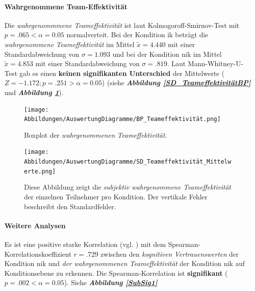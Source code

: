 \documentclass[a4paper,11pt]{article}%
\renewcommand{\\}{\vspace*{0.5\baselineskip} \newline}
\begin{document}
\paragraph{Wahrgenommene Team-Effektivität}
Die \textit{wahrgenommmene Teameffektivität} ist laut Kolmogoroff-Smirnov-Test mit $p = .065 < \alpha = 0.05$ normalverteit. 
Bei der Kondition \ac{ik} beträgt die \textit{wahrgenommene Teameffektivität} im Mittel $\tilde x = 4.440$ mit einer Standardabweichung von $\sigma = 1.093$ und bei der Kondition \ac{nik} im Mittel $\tilde x = 4.853$ mit einer Standardabweichung von $\sigma = .819$. 
Laut Mann-Whitney-U-Test gab es einen \textbf{keinen signifikanten Unterschied} der Mittelwerte ($ Z = -1.172; p = .251 > \alpha = 0.05$) (siehe \textbf{\textit{Abbildung \ref{SD_TeameffektivitätBP}}} und \textbf{\textit{Abbildung \ref{SD_Teameffektivität_Mittelwerte}}}).

		\begin{figure}[H]
   \begin{minipage}[t]{.5\linewidth} %
      \texttt{[image: Abbildungen/AuswertungDiagramme/BP\_Teameffektivität.png]}
      \caption[Boxplot der \textit{wahrgenommenen Teameffektivität}]{Boxplot der \textit{wahrgenommenen Teameffektivität}.}
            \label{SD_TeameffektivitätBP}
   \end{minipage}
   \hspace{.02\linewidth}%
   \begin{minipage}[t]{.5\linewidth} %
     \texttt{[image: Abbildungen/AuswertungDiagramme/SD\_Teameffektivität\_Mittelwerte.png]}
      \caption[Durchschnittlich \textit{wahrgenommene Teameffektivität}]{Diese Abbildung zeigt die \textit{subjektiv wahrgenommene Teameffektivität} der einzelnen Teilnehmer pro Kondition. Der vertikale Fehler beschreibt den Standardfehler.}
       \label{SD_Teameffektivität_Mittelwerte}
   \end{minipage}
\end{figure}


\paragraph{Weitere Analysen}
Es ist eine positive starke Korrelation (vgl. \citep{cohen2013statistical}) mit dem Spearman-Korrelationskoeffizient $r = .729$ zwischen den \textit{kognitiven Vertrauenswerten} der Kondition \ac{nik} und \textit{der wahrgenommenen Teameffektivität} der Kondition \ac{nik} auf Konditionsebene zu erkennen. Die Spearman-Korrelation ist \textbf{signifikant} ($p = .002 < \alpha = 0.05$). Siehe \textbf{\textit{Abbildung \ref{SubSig1}}}\\
\end{document}
